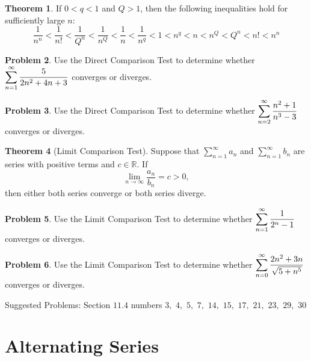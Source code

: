 \documentclass[letterpaper, twoside, 12pt]{book}
\theoremstyle{definition}
\newtheorem{theorem}{Theorem}
\theoremstyle{definition}
\newtheorem{problem}[theorem]{Problem}
\newcommand{\ds}{\ensuremath{\displaystyle}}
\begin{document}
\begin{theorem}
  If $0<q<1$ and $Q>1$, then the following inequalities hold for sufficiently
  large $n$:
  \[
    \frac{1}{n^n}
      <
    \frac{1}{n!}
      <
    \frac{1}{Q^n}
      <
    \frac{1}{n^Q}
      <
    \frac{1}{n}
      <
    \frac{1}{n^q}
      <
    1
      <
    n^q
      <
    n
      <
    n^Q
      <
    Q^n
      <
    n!
      <
    n^n
  \]
\end{theorem}

\begin{problem}
 Use the Direct Comparison Test to
 determine whether $\ds \sum_{n=1}^{\infty} \frac{5}{2n^2+4n+3}$ converges or diverges.
\end{problem}

\vfill

\begin{problem}
 Use the Direct Comparison Test to
 determine whether $\ds \sum_{n=2}^{\infty} \frac{n^2+1}{n^3-3}$ converges or diverges.
\end{problem}

\vfill

\newpage

\begin{theorem}[Limit Comparison Test]
 Suppose that $\sum_{n=1}^{\infty} a_n$ and $\sum_{n=1}^{\infty} b_n$ are series with positive terms and $c \in \mathbb{R}$.  If $$\lim_{n \rightarrow \infty} \frac{a_n}{b_n} = c > 0,$$ then either both series converge or both series diverge.
\end{theorem}

\begin{problem}
Use the Limit Comparison Test to
determine whether $\ds \sum_{n = 1}^{\infty} \frac{1}{2^n-1}$
converges or diverges.
\end{problem}

\vfill

\begin{problem}
Use the Limit Comparison Test to
determine whether $\ds \sum_{n=0}^{\infty} \frac{2n^2+3n}{\sqrt{5+n^5}}$
converges or diverges.
\end{problem}

\vfill

\noindent Suggested Problems: Section $11.4$ numbers $3,$ $4,$ $5,$ $7,$ $14,$ $15,$ $17,$ $21,$ $23,$ $29,$ $30$

\newpage

\section{Alternating Series}
\end{document}
